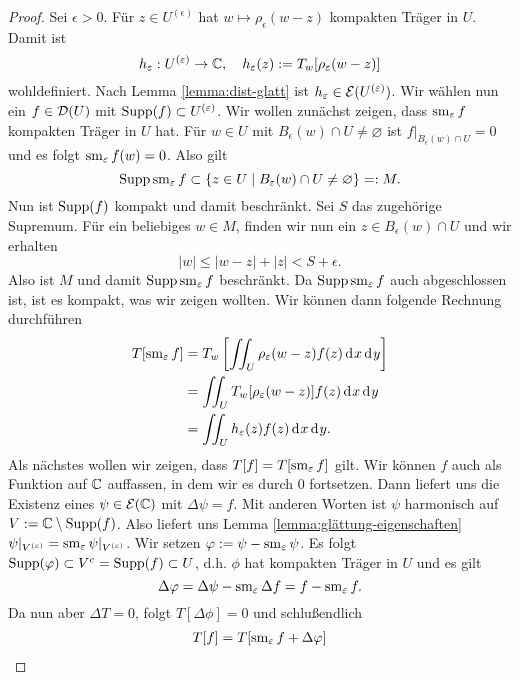 \begin{proof}
  Sei $\epsilon > 0$. Für $z \in U^{(\epsilon)}$ hat $w \mapsto
  \rho_\epsilon(w - z)$ kompakten Träger in $U$. Damit ist
  \[
  h_\varepsilon : U^{(\varepsilon)} \rightarrow \mathbb{C}, \quad h_\varepsilon(z) :=
  T_w[\rho_\varepsilon(w - z)]
  \]
  wohldefiniert. Nach Lemma \ref{lemma:dist-glatt} ist $h_\varepsilon \in
  \mathcal{E}(U^{(\varepsilon)})$. 
  Wir wählen nun ein $f \in \mathcal{D}(U)$ mit $\operatorname{Supp}(f) \subset U^{(\varepsilon)}$. Wir
  wollen zunächst zeigen, dass $\operatorname{sm}_\varepsilon f$ kompakten Träger in
  $U$ hat. Für $w \in U$ mit
  $B_\epsilon(w) \cap U \neq \varnothing$ ist $f|_{B_\epsilon(w) \cap U}
  = 0$ und es folgt $\operatorname{sm}_\varepsilon f(w) = 0$. Also gilt
  \[
  \operatorname{Supp} \operatorname{sm}_\varepsilon f \subset \{ z \in U \mid B_\varepsilon(w) \cap U \neq
  \varnothing\} =: M.
  \]
  Nun ist $\operatorname{Supp}(f)$ kompakt und damit
  beschränkt. Sei $S$ das zugehörige Supremum. Für ein beliebiges $w
  \in M$, finden wir nun ein $z \in B_\epsilon(w) \cap U$ und wir
  erhalten
  \[
  |w| \leq |w-z| + |z| < S + \epsilon.
  \]
  Also ist $M$ und damit $\operatorname{Supp} \operatorname{sm}_\varepsilon f$ beschränkt. Da $\operatorname{Supp}
  \operatorname{sm}_\varepsilon f$ auch abgeschlossen ist, ist es kompakt, was wir
  zeigen wollten. Wir können dann folgende Rechnung durchführen
  \begin{align}
    T[\sm_\epsilon f] & = T_w \left [ \iint_U \rho_\epsilon(w - z)
      f(z) \d[x]\d[y] \right ] \nonumber \\
    & = \iint_U T_w[\rho_\epsilon(w-z)] f(z)
    \d[x]\d[y] \label{eq:weyl} \\
    & = \iint_U h_\epsilon(z) f(z) \d[x]\d[y]. \nonumber
  \end{align}
  Als nächstes wollen wir zeigen, dass $T[f] = T[\operatorname{sm}_\varepsilon f]$
  gilt. Wir können $f$ auch als Funktion auf $\mathbb{C}$ auffassen, in dem
  wir es durch 0 fortsetzen. Dann liefert uns \cite[Kor. 13.3]{For} die
  Existenz eines $\psi \in \mathcal{E}(\mathbb{C})$ mit $\Delta \psi = f$. 
  Mit anderen Worten ist $\psi$ harmonisch auf \break$V:= \mathbb{C} \setminus \operatorname{Supp}(f)$. Also
  liefert uns Lemma \ref{lemma:glättung-eigenschaften} $\psi|_{V^{(\varepsilon)}}
  = \operatorname{sm}_\varepsilon \psi|_{V^{(\varepsilon)}}$. Wir setzen \break$\varphi := \psi -
  \operatorname{sm}_\varepsilon\psi$. Es folgt $\operatorname{Supp}(\varphi) \subset V^c = \operatorname{Supp}(f)
  \subset U$, d.h. $\phi$ hat kompakten Träger in $U$ und es gilt
  \[
  \Delta \varphi = \Delta \psi - \operatorname{sm}_\varepsilon \Delta f = f - \operatorname{sm}_\varepsilon
  f.
  \]
  Da nun aber $\Delta T = 0$, folgt $T[\Delta \phi] = 0$ und
  schlußendlich
  \begin{align*}
    T[f] & = T[\sm_\epsilon f + \Delta \phi] \\

\end{align*}
\end{proof}
